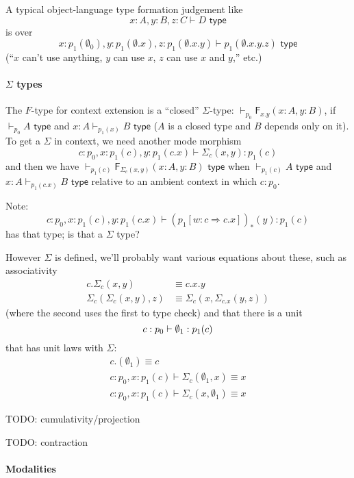 \documentclass[10pt]{article}
\newcommand{\yields}{\vdash}
\newcommand{\type}{\,\,\mathsf{type}}
\newcommand\F[2]{\ensuremath{\mathsf{F}_{#1}(#2)}}
\begin{document}
A typical object-language type formation judgement like 
\[
x : A, y : B, z : C \vdash D \type
\]
is over
\[
x : p_1(\emptyset_0), y : p_1(\emptyset.x), z : p_1(\emptyset.x.y) \vdash p_1(\emptyset.x.y.z) \type
\]
(``$x$ can't use anything, $y$ can use $x$, $z$ can use $x$ and $y$,'' etc.) 

\paragraph{$\Sigma$ types}
The $F$-type for context extension is a ``closed'' $\Sigma$-type:
$\yields_{p_0} \F{x.y}{x : A, y : B}$, if $\yields_{p_0} A \type$ and $x
: A \vdash_{p_1(x)} B \type$ ($A$ is a closed type and $B$ depends only
on it).  To get a $\Sigma$ in context, we need another mode morphism
\[
c : p_0, x : p_1(c), y : p_1(c.x) \yields \Sigma_c(x,y) : p_1(c) 
\]
and then we have $\vdash_{p_1(c)} \F{\Sigma_c(x,y)}{x : A, y : B} \type$
when $\yields_{p_1(c)} A \type$ and $x : A \vdash_{p_1(c.x)} B \type$
relative to an ambient context in which $c : p_0$.

Note:
\[
c : p_0, x : p_1(c), y : p_1(c.x) \yields (p_1[w : c \Rightarrow c.x])_*(y) : p_1(c) 
\]
has that type; is that a $\Sigma$ type?

However $\Sigma$ is defined, we'll probably want various equations about
these, such as associativity
\begin{align*}
c.\Sigma_c(x,y) &\equiv c.x.y \\
\Sigma_c(\Sigma_c(x,y),z) & \equiv \Sigma_c(x,\Sigma_{c.x}(y,z))
\end{align*}
(where the second uses the first to type check)
and that there is a unit 
\[
c : p_0 \yields \emptyset_1 : p_1(c) \\
\]
that has unit laws with $\Sigma$:  
\begin{align*}
c.(\emptyset_1) \equiv c\\
c : p_0, x : p_1(c) \yields \Sigma_c(\emptyset_1,x) \equiv x\\
c : p_0, x : p_1(c) \yields \Sigma_c(x,\emptyset_1) \equiv x
\end{align*}

TODO: cumulativity/projection

TODO: contraction

\paragraph{Modalities}
\end{document}
